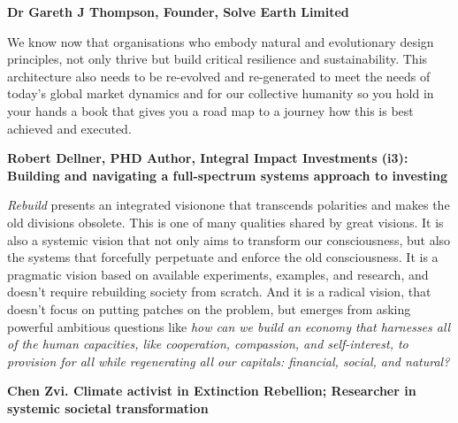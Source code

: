  {\raggedleft \textemdash \textbf{Dr Gareth J Thompson, Founder, Solve Earth Limited}}
\vspace{1.5ex}




\noindent We know now that organisations who embody natural and evolutionary design principles, not only thrive but build critical resilience and sustainability. 
This architecture also needs to be re-evolved and re-generated to meet the needs of today's global market dynamics and for our collective humanity so you hold in your hands a book that gives you a road map to a journey how this is best achieved and executed. 


{\raggedleft \textemdash \textbf{Robert Dellner, PHD
Author, Integral Impact Investments (i3): Building and navigating a full-spectrum systems approach to investing}}
\vspace{1.5ex}


\noindent \emph{Rebuild} presents an integrated vision\textemdash one that transcends polarities and makes the old divisions obsolete. This is one of many qualities shared by great visions. It is also a systemic vision that not only aims to transform our consciousness, but also the systems that forcefully perpetuate and enforce the old consciousness. It is a pragmatic vision based on available experiments, examples, and research, and doesn't require rebuilding society from scratch. And it is a radical vision, that doesn't focus on putting patches on the problem, but emerges from asking powerful ambitious questions like \emph{how can we build an economy that harnesses all of the human capacities, like cooperation, compassion, and self-interest, to provision for all while regenerating all our capitals: financial, social, and  natural?}


{\raggedleft \textemdash \textbf{Chen Zvi. Climate activist in Extinction Rebellion;
Researcher in systemic societal transformation}}
\vspace{1.5ex}